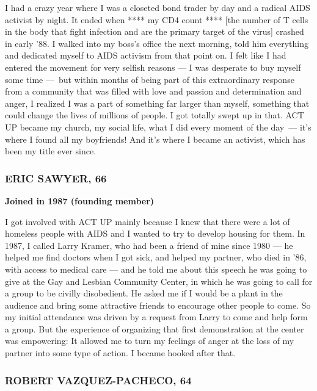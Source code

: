 I had a crazy year where I was a closeted bond trader by day and a
radical AIDS activist by night. It ended when **** my CD4 count ****
{[}the number of T cells in the body that fight infection and are the
primary target of the virus{]} crashed in early '88. I walked into my
boss's office the next morning, told him everything and dedicated myself
to AIDS activism from that point on. I felt like I had entered the
movement for very selfish reasons --- I was desperate to buy myself some
time ---~but within months of being part of this extraordinary response
from a community that was filled with love and passion and determination
and anger, I realized I was a part of something far larger than myself,
something that could change the lives of millions of people. I got
totally swept up in that. ACT UP became my church, my social life, what
I did every moment of the day~--- it's where I found all my boyfriends!
And it's where I became an activist, which has been my title ever since.

\hypertarget{eric-sawyer-66}{%
\subsubsection{ERIC SAWYER, 66}\label{eric-sawyer-66}}

\textbf{Joined in 1987 (founding member)}

I got involved with ACT UP mainly because I knew that there were a lot
of homeless people with AIDS and I wanted to try to develop housing for
them. In 1987, I called Larry Kramer, who had been a friend of mine
since 1980 --- he helped me find doctors when I got sick, and helped my
partner, who died in '86, with access to medical care --- and he told me
about this speech he was going to give at the Gay and Lesbian Community
Center, in which he was going to call for a group to be civilly
disobedient. He asked me if I would be a plant in the audience and bring
some attractive friends to encourage other people to come. So my initial
attendance was driven by a request from Larry to come and help form a
group. But the experience of organizing that first demonstration at the
center was empowering: It allowed me to turn my feelings of anger at the
loss of my partner into some type of action. I became hooked after that.

\hypertarget{robert-vazquez-pacheco-64}{%
\subsubsection{ROBERT VAZQUEZ-PACHECO,
64}\label{robert-vazquez-pacheco-64}}

